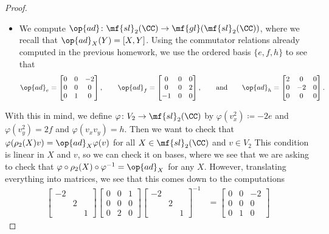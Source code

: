 \documentclass[../notes.tex]{subfiles}
\begin{document}
\begin{proof}
\begin{itemize}
		\item We compute $\op{ad}\colon\mf{sl}_2(\CC)\to\mf{gl}(\mf{sl}_2(\CC))$, where we recall that $\op{ad}_X(Y)=[X,Y]$. Using the commutator relations already computed in the previous homework, we use the ordered basis $\{e,f,h\}$ to see that
		\[{\op{ad}_e}=\begin{bmatrix}
			0 & 0 & -2 \\
			0 & 0 & 0 \\
			0 & 1 & 0
		\end{bmatrix},\qquad{\op{ad}_f}=\begin{bmatrix}
			0 & 0 & 0 \\
			0 & 0 & 2 \\
			-1 & 0 & 0
		\end{bmatrix},\qquad\text{and}\qquad{\op{ad}_h}=\begin{bmatrix}
			2 & 0 & 0 \\
			0 & -2 & 0 \\
			0 & 0 & 0
		\end{bmatrix}.\]
	\end{itemize}
	With this in mind, we define $\varphi\colon V_2\to\mf{sl}_2(\CC)$ by $\varphi\left(v_x^2\right)\coloneqq-2e$ and $\varphi\left(v_y^2\right)=2f$ and $\varphi\left(v_xv_y\right)=h$. Then we want to check that $\varphi(\rho_2(X)v)=\op{ad}_X\varphi(v)$ for all $X\in\mf{sl}_2(\CC)$ and $v\in V_2$ This condition is linear in $X$ and $v$, so we can check it on bases, where we see that we are asking to check that $\varphi\circ\rho_2(X)\circ\varphi^{-1}={\op{ad}_X}$ for any $X$. However, translating everything into matrices, we see that this comes down to the computations
	\begin{align*}
		\begin{bmatrix}
			-2 \\ & 2 \\ & & 1
		\end{bmatrix}\begin{bmatrix}
			0 & 0 & 1 \\
			0 & 0 & 0 \\
			0 & 2 & 0
		\end{bmatrix}\begin{bmatrix}
			-2 \\ & 2 \\ & & 1
		\end{bmatrix}^{-1} &= \begin{bmatrix}
			0 & 0 & -2 \\
			0 & 0 & 0 \\
			0 & 1 & 0

\end{bmatrix}
\end{align*}
\end{proof}
\end{document}
